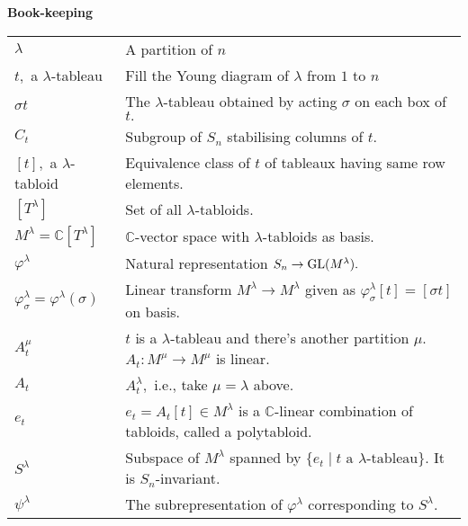 



\newpage
\textbf{Book-keeping} 

\begin{tabular}{|l|l|}
	\hline
	$\lambda$ & A partition of $n$\\
	$t,$ a $\lambda$-tableau & Fill the Young diagram of $\lambda$ from $1$ to $n$\\
	$\sigma t$ & The $\lambda$-tableau obtained by acting $\sigma$ on each box of $t.$ \\
	$C_t$ & Subgroup of $S_n$ stabilising columns of $t.$\\
	$[t],$ a $\lambda$-tabloid & Equivalence class of $t$ of tableaux having same row elements.\\
	$[T^\lambda]$ & Set of all $\lambda$-tabloids.\\
	$M^\lambda = \mathbb{C}[T^\lambda]$ & $\mathbb{C}$-vector space with $\lambda$-tabloids as basis.\\
	$\varphi^\lambda$ & Natural representation $S_n \to \operatorname{GL}(M^\lambda).$\\
	$\varphi^\lambda_\sigma = \varphi^\lambda(\sigma)$ & Linear transform $M^\lambda \to M^\lambda$ given as $\varphi^\lambda_\sigma[t] = [\sigma t]$ on basis.\\
	$A^\mu_t$ & $t$ is a $\lambda$-tableau and there's another partition $\mu.$ $A_t : M^\mu \to M^\mu$ is linear.\\
	$A_t$ & $A^\lambda_t,$ i.e., take $\mu = \lambda$ above.\\
	$e_t$ & $e_t = A_t[t] \in M^\lambda$ is a $\mathbb{C}$-linear combination of tabloids, called a polytabloid.\\
	$S^\lambda$ & Subspace of $M^\lambda$ spanned by $\{e_t \mid t \text{ a } \lambda\text{-tableau}\}$. It is $S_n$-invariant.\\
	$\psi^\lambda$ & The subrepresentation of $\varphi^\lambda$ corresponding to $S^\lambda.$\\
	\hline
\end{tabular}
\label{bookkeeping}
